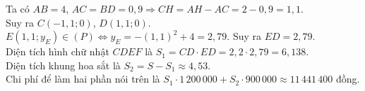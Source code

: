 \begin{bt}
{{\begin{tikzpicture}[scale=0.8,thick,>=stealth, font=\footnotesize, line join=round, line cap=round]
			\end{tikzpicture}
		}
		\noindent
		Ta có $AB=4$, $AC=BD=0{,}9 \Rightarrow CH=AH-AC=2-0{,}9=1{,}1$.\\
		Suy ra $C(-1{,}1;0)$, $D(1{,}1;0)$.\\
		$E(1{,}1;y_E) \in (P) \Leftrightarrow y_E=-(1{,}1)^2+4=2{,}79$.
		Suy ra $ED=2{,}79$.\\
		Diện tích hình chữ nhật $CDEF$ là $S_1=CD\cdot ED=2{,}2\cdot 2{,}79=6{,}138$.\\
		Diện tích khung hoa sắt là $S_2=S-S_1\approx 4{,}53 $.\\
		Chi phí để làm hai phần nói trên là $S_1\cdot 1\,200\,000+ S_2\cdot 900\,000\approx 11\,441\,400 $ đồng.
	}
\end{bt}
